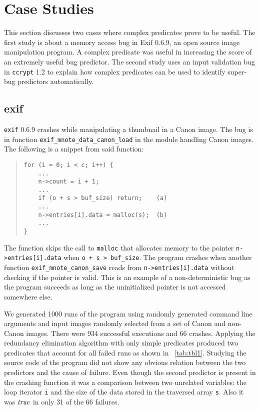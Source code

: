 
\section{Case Studies}
\label{sec-qual}
This section discusses two cases where complex predicates prove to be useful.  The first study is about a memory access bug in Exif 0.6.9, an open source image manipulation program.  A complex predicate was useful in increasing the score of an extremely useful bug predictor.  The second study uses an input validation bug in \texttt{ccrypt} 1.2 to explain how complex predicates can be used to identify super-bug predictors automatically.

\subsection{exif}
\texttt{exif} 0.6.9 crashes while manipulating a thumbnail in a Canon image.  The bug is in function \texttt{exif\_mnote\_data\_canon\_load} in the module handling Canon images.  The following is a snippet from said function:
\begin{quote}
\begin{verbatim}
for (i = 0; i < c; i++) {
    ...
    n->count = i + 1;
    ...
    if (o + s > buf_size) return;    (a)
    ...
    n->entries[i].data = malloc(s);  (b)
    ...
}
\end{verbatim}
\end{quote}

The function skips the call to \texttt{malloc} that allocates memory to the pointer \texttt{n->entries[i].data} when \texttt{o + s > buf\_size}.  The program crashes when another function \texttt{exif\_\-mnote\_\-canon\_save} reads from \texttt{n->entries[i].data} without checking if the pointer is valid.  This is an example of a non-deterministic bug as the program succeeds as long as the uninitialized pointer is not accessed somewhere else.

We generated 1000 runs of the program using randomly generated command line arguments and input images randomly selected from a set of Canon and non-Canon images.  There were 934 successful executions and 66 crashes.  Applying the redundancy elimination algorithm with only simple predicates produced two predicates that account for all failed runs as shown in ~\autoref{tab:tbl1}.  Studying the source code of the program did not show any obvious relation between the two predictors and the cause of failure.  Even though the second predictor is present in the crashing function it was a comparison between two unrelated variables: the loop iterator \texttt{i} and the size of the data stored in the traversed array \texttt{s}.  Also it was $\mathit{true}$ in only 31 of the 66 failures.

